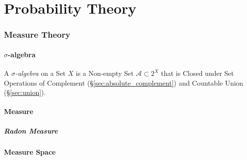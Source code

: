 \part{Probability Theory}\label{part:probability_theory}

\section{Measure Theory}\label{sec:measure_theory}

\subsection{$\sigma$-algebra}\label{sec:sigma_algebra}

A \emph{$\sigma$-algebra} on a Set $X$ is a Non-empty Set $\mathcal{A}
\subset 2^X$ that is Closed under Set Operations of Complement
(\S\ref{sec:absolute_complement}) and Countable Union
(\S\ref{sec:union}).



\subsection{Measure}\label{sec:measure}

\subsubsection{Radon Measure}\label{sec:radon_measure}



\subsection{Measure Space}\label{sec:measure_space}

